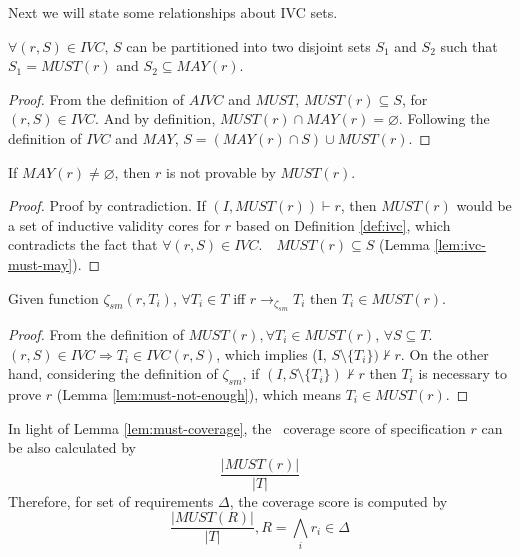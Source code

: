 Next we will state some relationships about IVC sets.

\begin{lemma}
  \label{lem:ivc-must-may}
 $\forall (r, S) \in IVC$, $S$ can be partitioned into two disjoint sets $S_1$ and $S_2$
  such that $S_1 = MUST(r)$ and $S_2 \subseteq MAY(r)$.
\end{lemma}
\begin{proof}
 From the definition of $AIVC$ and $MUST$, $MUST(r) \subseteq S$, for $(r, S) \in IVC$. And
 by definition, $MUST(r) \cap MAY(r) = \varnothing$. Following the definition of $IVC$
 and $MAY$, $S = (MAY(r) \cap S) \cup MUST(r)$.
\end{proof}
\vspace{2mm}

\begin{lemma}
  \label{lem:must-not-enough}
  If $MAY(r) \neq \varnothing$, then $r$ is not provable by $MUST(r)$.
\end{lemma}
\begin{proof}
  Proof by contradiction. If $(I, MUST(r)) \vdash r$, then $MUST(r)$
  would be a set of inductive validity cores for $r$ based on Definition \ref{def:ivc},
  which contradicts the fact that $\forall (r, S) \in IVC. \quad MUST(r) \subseteq S$ (Lemma \ref{lem:ivc-must-may}).
\end{proof}
\vspace{2mm}

\begin{lemma}
  \label{lem:must-coverage}
   
  Given function $\zeta_{sm}(r, T_i)$, $\forall T_i \in T$ iff
  $r \rightarrow_{\zeta_{sm}} T_i$ then $T_i \in MUST(r)$.
\end{lemma}
\begin{proof}
 From the definition of $MUST(r), \forall T_i \in MUST (r)$, $\forall S \subseteq T$. $(r, S) \in IVC \Rightarrow T_i \in IVC(r, S)$,
 which implies (I, $S \setminus \{ T_i \}) \nvdash r$.
 On the other hand, considering the definition of $\zeta_{sm}$, if
 $(I, S \setminus \{ T_i \}) \nvdash r$ then $T_i$ is necessary to prove $r$ (Lemma \ref{lem:must-not-enough}), which means $T_i \in MUST(r)$.
\end{proof}
\vspace{2mm}

In light of Lemma \ref{lem:must-coverage}, the \nondetcov\ coverage score of specification $r$ can be also calculated by
$$\frac{|MUST(r)|}{|T|}$$
Therefore, for set of requirements $\Delta$, the coverage score is computed by $$\frac{|MUST(R)|}{|T|},\xspace  R = \bigwedge_{i} {r_i \in \Delta}$$

